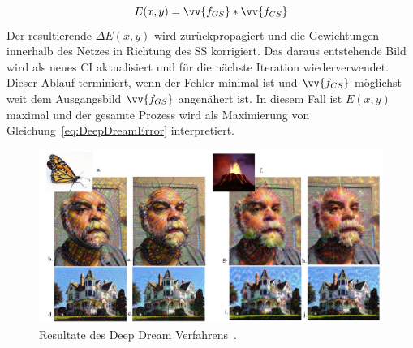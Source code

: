 \documentclass[times, 11pt,twocolumn]{article}
\begin{document}
\footnotesize
\begin{equation}
E(x,y)= \vv{f_{GS}}* \vv{f_{CS}}
\label{eq:DeepDreamError}
\end{equation}
\small
Der resultierende  $\Delta E(x,y)$ wird zurückpropagiert und die Gewichtungen innerhalb des Netzes in Richtung des SS korrigiert. Das daraus entstehende Bild wird als neues CI aktualisiert und für die nächste Iteration wiederverwendet.
Dieser Ablauf terminiert, wenn der Fehler minimal ist und $\vv{f_{CS}}$  möglichst weit dem Ausgangsbild $\vv{f_{GS}}$ angenähert ist. In diesem Fall ist $E(x,y)$ maximal und der gesamte Prozess wird als Maximierung von Gleichung~\ref{eq:DeepDreamError} interpretiert.\\

\begin{figure}
	\flushleft
	\includegraphics[width=\columnwidth]{Bilder/DeepDreamResults.JPG}
	\caption{Resultate des Deep Dream Verfahrens~\cite{McCaigDG16}.}
	\label{fig:DeepDreamResults}
\end{figure}
\end{document}
